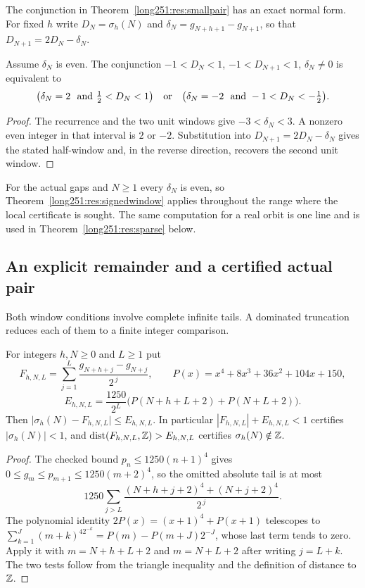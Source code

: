 \documentclass[11pt]{article}
\begin{document}
The conjunction in Theorem~\ref{long251:res:smallpair} has an exact normal form.  For
fixed $h$ write $D_N=\sigma_h(N)$ and $\delta_N=g_{N+h+1}-g_{N+1}$, so that
$D_{N+1}=2D_N-\delta_N$.

\begin{theorem}\label{long251:res:signedwindow}
Assume $\delta_N$ is even.  The conjunction
$-1<D_N<1$, $-1<D_{N+1}<1$, $\delta_N\ne0$ is equivalent to
\[
 \bigl(\delta_N=2\ \hbox{ and }\tfrac12<D_N<1\bigr)
 \quad\hbox{or}\quad
 \bigl(\delta_N=-2\ \hbox{ and }-1<D_N<-\tfrac12\bigr).
\]
\end{theorem}

\begin{proof}
The recurrence and the two unit windows give $-3<\delta_N<3$.  A nonzero even
integer in that interval is $2$ or $-2$.  Substitution into
$D_{N+1}=2D_N-\delta_N$ gives the stated half-window and, in the reverse
direction, recovers the second unit window.
\end{proof}

For the actual gaps and $N\ge1$ every $\delta_N$ is even, so
Theorem~\ref{long251:res:signedwindow} applies throughout the range where the local
certificate is sought.  The same computation for a real orbit is one line and
is used in Theorem~\ref{long251:res:sparse} below.

\subsection{An explicit remainder and a certified actual pair}

Both window conditions involve complete infinite tails.  A dominated
truncation reduces each of them to a finite integer comparison.

\begin{proposition}\label{long251:res:explicit-remainder}
For integers $h,N\ge0$ and $L\ge1$ put
\[
 F_{h,N,L}=\sum_{j=1}^{L}\frac{g_{N+h+j}-g_{N+j}}{2^{\,j}},\qquad
 P(x)=x^4+8x^3+36x^2+104x+150,
\]
\[
 E_{h,N,L}=\frac{1250}{2^{L}}\bigl(P(N+h+L+2)+P(N+L+2)\bigr).
\]
Then $\bigl|\sigma_h(N)-F_{h,N,L}\bigr|\le E_{h,N,L}$.  In particular
$|F_{h,N,L}|+E_{h,N,L}<1$ certifies $|\sigma_h(N)|<1$, and
$\operatorname{dist}(F_{h,N,L},\mathbb{Z})>E_{h,N,L}$ certifies
$\sigma_h(N)\notin\mathbb{Z}$.
\end{proposition}

\begin{proof}
The checked bound $p_n\le1250(n+1)^4$ gives $0\le g_m\le p_{m+1}\le1250(m+2)^4$,
so the omitted absolute tail is at most
\[
 1250\sum_{j>L}\frac{(N+h+j+2)^4+(N+j+2)^4}{2^{\,j}} .
\]
The polynomial identity $2P(x)=(x+1)^4+P(x+1)$ telescopes to
$\sum_{k=1}^{J}(m+k)^42^{-k}=P(m)-P(m+J)2^{-J}$, whose last term tends to zero.
Apply it with $m=N+h+L+2$ and $m=N+L+2$ after writing $j=L+k$.  The two tests
follow from the triangle inequality and the definition of distance to $\mathbb{Z}$.
\end{proof}
\end{document}
